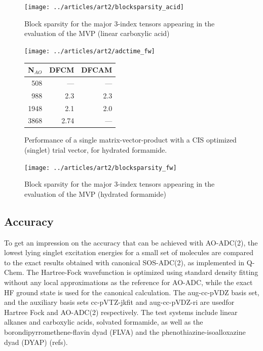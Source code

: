 \begin{figure}
\centering
\texttt{[image: ../articles/art2/blocksparsity\_acid]}
\caption{Block sparsity for the major 3-index tensors appearing in the evaluation of the MVP (linear carboxylic acid)}
\label{fig:ES_SPARSITY_LCA}
\end{figure}

\begin{figure}
\begin{minipage}{0.5\textwidth}
\centering
\texttt{[image: ../articles/art2/adctime\_fw]}
\end{minipage}
\begin{minipage}{0.4\textwidth}
\centering
\begin{tabular}{rrr}
\hline
N$_{AO}$ & DFCM & DFCAM \\ \hline
508	& ---	& --- \\
988	& 2.3	& 2.3 \\
1948 & 	2.1 &	2.0 \\
3868	 & 2.74 & --- \\
 \hline
\end{tabular}
\end{minipage}
\caption{Performance of a single matrix-vector-product with a CIS optimized (singlet) trial vector, for hydrated formamide.}
\label{fig:ES_TIME_FW}
\end{figure}

\begin{figure}
\centering
\texttt{[image: ../articles/art2/blocksparsity\_fw]}
\caption{Block sparsity for the major 3-index tensors appearing in the evaluation of the MVP (hydrated formamide)}
\label{fig:ES_SPARSITY_FW}
\end{figure}

\subsection{Accuracy}

To get an impression on the accuracy that can be achieved with AO-ADC(2), the lowest lying singlet excitation energies for a small set of molecules are compared to the exact results obtained with canonical SOS-ADC(2), as implemented in Q-Chem. The Hartree-Fock wavefunction is optimized using standard density fitting without any local approximations as the reference for AO-ADC, while the exact HF ground state is used for the canonical calculation. The aug-cc-pVDZ basis set, and the auxiliary basis sets cc-pVTZ-jkfit and aug-cc-pVDZ-ri are usedfor Hartree Fock and AO-ADC(2) respectively. The test systems include linear alkanes and carboxylic acids, solvated formamide, as well as the borondipyrromethene-flavin dyad (FLVA) and the phenothiazine-isoalloxazine dyad (DYAP) (refs). 

